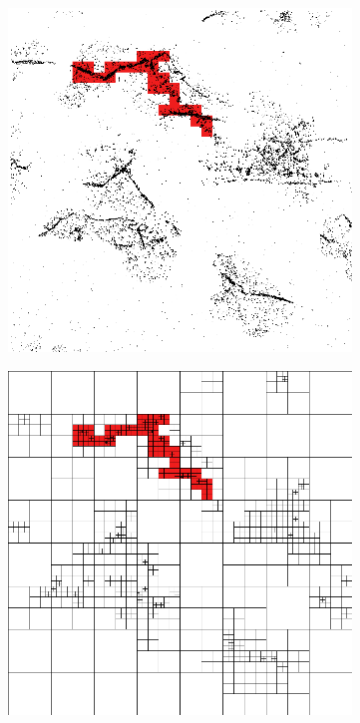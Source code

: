 \begin{figure}[tbhp]
	\centering
	\begin{subfigure}[c]{4.2cm}
		\includegraphics[width=\textwidth]{single-cluster.png}
		\caption{}\label{fig:single-cluster-points}
	\end{subfigure}%
	\quad
	\begin{subfigure}[c]{4.2cm}
		\includegraphics[width=\textwidth]{single-cluster-lines.png}

\end{subfigure}
\end{figure}

